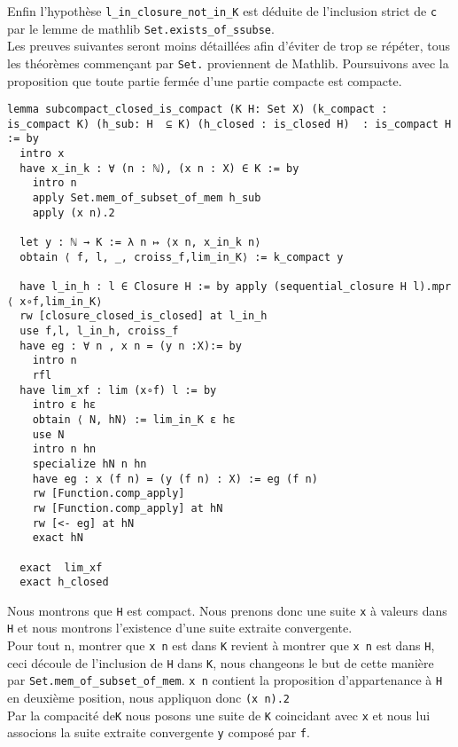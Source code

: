 \documentclass[a4paper, 12pt]{article}
\newcommand{\lean}[1]{\texttt{#1}}
\begin{document}
Enfin l'hypothèse \lean{l_in_closure_not_in_K} est déduite de l'inclusion strict de \lean{c} par le lemme de mathlib \lean{Set.exists_of_ssubse}.\\


Les preuves suivantes seront moins détaillées afin d'éviter de trop se répéter, tous les théorèmes commençant par \lean{Set.} proviennent de Mathlib. Poursuivons avec la proposition que toute partie fermée d'une partie compacte est compacte.\\


\begin{verbatim}   
lemma subcompact_closed_is_compact (K H: Set X) (k_compact : is_compact K) (h_sub: H  ⊆ K) (h_closed : is_closed H)  : is_compact H := by
  intro x
  have x_in_k : ∀ (n : ℕ), (x n : X) ∈ K := by
    intro n
    apply Set.mem_of_subset_of_mem h_sub
    apply (x n).2

  let y : ℕ → K := λ n ↦ ⟨x n, x_in_k n⟩
  obtain ⟨ f, l, _, croiss_f,lim_in_K⟩ := k_compact y

  have l_in_h : l ∈ Closure H := by apply (sequential_closure H l).mpr  ⟨ x∘f,lim_in_K⟩
  rw [closure_closed_is_closed] at l_in_h
  use f,l, l_in_h, croiss_f
  have eg : ∀ n , x n = (y n :X):= by
    intro n
    rfl
  have lim_xf : lim (x∘f) l := by
    intro ε hε
    obtain ⟨ N, hN⟩ := lim_in_K ε hε
    use N
    intro n hn
    specialize hN n hn
    have eg : x (f n) = (y (f n) : X) := eg (f n)
    rw [Function.comp_apply]
    rw [Function.comp_apply] at hN
    rw [<- eg] at hN
    exact hN
    
  exact  lim_xf
  exact h_closed
\end{verbatim}

Nous montrons que \lean{H} est compact. Nous prenons donc une suite \lean{x} à valeurs dans \lean{H} et nous montrons l'existence d'une suite extraite convergente.\\

Pour tout n, montrer que \lean{x n} est dans \lean{K} revient à montrer que \lean{x n} est dans \lean{H}, ceci découle de l'inclusion de \lean{H} dans \lean{K}, nous changeons le but de cette manière par \lean{Set.mem_of_subset_of_mem}. \lean{x n} contient la proposition d'appartenance à \lean{H} en deuxième position, nous appliquon donc \lean{(x n).2}\\

Par la compacité de\lean{K} nous posons une suite de \lean{K} coincidant avec \lean{x} et nous lui associons la suite extraite convergente \lean{y} composé par \lean{f}.\\
\end{document}
